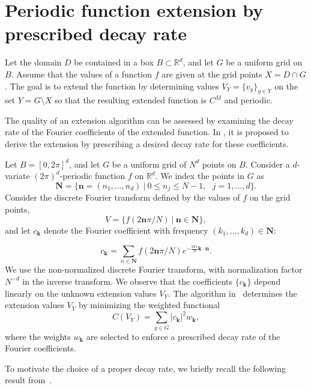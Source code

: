\documentclass[11pt,oneside,reqno]{amsart}
\theoremstyle{plain}
\numberwithin{equation}{section}
\begin{document}
\section{\bf Periodic function extension by prescribed decay rate}

Let the domain $D$ be contained
in a box $B \subset \mathbb{R}^d$,
and let $G$ be a uniform grid on $B$.
Assume that the values of a function $f$
are given at the grid points
$X=D \cap G$.
The goal is to extend the function
by determining values
$V_Y=\{v_y\}_{y\in Y}$ on the set
$Y=G\setminus X$
so that the resulting extended function
is $C^M$ and periodic.

The quality of an extension algorithm
can be assessed by examining
the decay rate of the Fourier coefficients
of the extended function.
In \cite{GL10}, it is proposed to derive the extension
by prescribing a desired decay rate
for these coefficients.


Let $B=[0,2\pi]^d$, and let $G$ be a uniform grid of $N^d$ points on $B$.
Consider a $d$-variate $(2\pi)^d$-periodic function $f$ on $\mathbb{R}^d$. We index the points in $G$ as
$$\mathbf{N}=\{\mathbf{n}=(n_1,...,n_d)\ |\  0\le n_j \le N-1,\ \ \ j=1,...,d\}.$$
Consider the discrete Fourier transform defined by the values of $f$ on the grid points,
$$V=\{f(2\mathbf{n}\pi/N)\ |\ \mathbf{n}\in \mathbf{N}\},$$
and let $c_{\mathbf{k}}$ denote the Fourier coefficient with frequency $(k_1,...,k_d)\in \mathbf{N}$:

\begin{equation}\label{c_k}
c_{\mathbf{k}}=\sum_{n\in\mathbf{N}}f(2\mathbf{n}\pi/N)e^{-\frac{2\pi i}{N}\mathbf{k}\cdot\mathbf{n}}.
\end{equation}
We use the non-normalized discrete Fourier transform,
with normalization factor $N^{-d}$ in the inverse transform.
We observe that the coefficients $\{c_{\mathbf{k}}\}$ depend linearly
on the unknown extension values $V_Y$. The algorithm in~\cite{GL10}
determines the extension values $V_Y$
by minimizing the weighted functional
\begin{equation}\label{wfunctional}
C(V_Y)=\sum_{g\in G} |c_{\mathbf{k}}|^2 w_{\mathbf{k}},
\end{equation}
where the weights $w_{\mathbf{k}}$ are selected
to enforce a prescribed decay rate
of the Fourier coefficients.

To motivate the choice of a proper decay rate,
we briefly recall the following result
from~\cite{GL10}.
\end{document}
